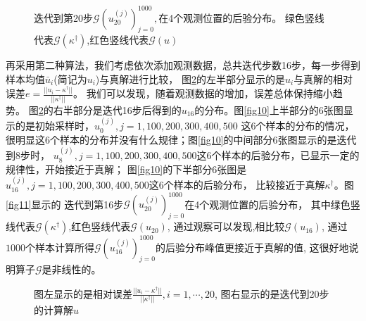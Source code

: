 \documentclass[a4paper,12pt,oneside,CJK]{cctbook}
\theoremstyle{definition}
\numberwithin{equation}{section}
\begin{document}
\begin{figure}
\caption{迭代到第20步$\mathcal{G}(u_{20}^{(j)})_{j=0}^{1000},$在4个观测位置的后验分布。
绿色竖线代表$\mathcal{G}(\kappa^{\dagger})$,红色竖线代表$\mathcal{G}(u)$}\label{fig8}
\end{figure}

再采用第二种算法，我们考虑依次添加观测数据，总共迭代步数16步，每一步得到样本均值$\bar{u}_i$(简记为$u_i$)与真解进行比较，
图\ref{fig9}的左半部分显示的是$u_i$与真解的相对误差$e=\frac{||u_i-\kappa^{\dagger}||}{||\kappa^{\dagger}||}$。
我们可以发现，随着观测数据的增加，误差总体保持缩小趋势。
图\ref{fig9}的右半部分是迭代16步后得到的$u_{16}$的分布。图\ref{fig10}上半部分的6张图显示的是初始采样时，$u_0^{(j)},j=1,100,200,300,400,500$
这6个样本的分布的情况，很明显这6个样本的分布并没有什么规律；图\ref{fig10}的中间部分6张图显示的是迭代到8步时，
$u_{8}^{(j)},j=1,100,200,300,400,500$这6个样本的后验分布，已显示一定的规律性，开始接近于真解；
图\ref{fig10}的下半部分6张图是$u_{16}^{(j)},j=1,100,200,300,400,500$这6个样本的后验分布，
比较接近于真解$\kappa^{\dagger}$。图\ref{fig11}显示的
迭代到第16步$\mathcal{G}(u_{20}^{(j)})_{j=0}^{1000}$在4个观测位置的后验分布，
其中绿色竖线代表$\mathcal{G}(\kappa^{\dagger})$,红色竖线代表$\mathcal{G}(u_{20})$,
通过观察可以发现,相比较$\mathcal{G}(u_{16})$,
通过$1000$个样本计算所得$\mathcal{G}(u_{16}^{(j)})_{j=0}^{1000}$的后验分布峰值更接近于真解的值,
这很好地说明算子$\mathcal{G}$是非线性的。

\begin{figure}
\caption{图左显示的是相对误差$\frac{||u_i-\kappa^{\dagger}||}{||\kappa^{\dagger}||},i=1,\cdots,20$,
图右显示的是迭代到20步的计算解$u$}\label{fig9}
\end{figure}
\end{document}
